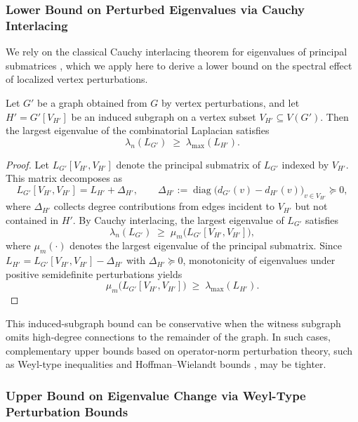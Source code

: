 \documentclass[
  11pt,
  letterpaper]{siamart251216}
\begin{document}
\subsubsection{Lower Bound on Perturbed Eigenvalues via Cauchy
Interlacing}\label{lower-bound-on-perturbed-eigenvalues-via-cauchy-interlacing}

We rely on the classical Cauchy interlacing theorem for eigenvalues of
principal submatrices \citep{Haemers1995, Chung1997Spectral}, which we
apply here to derive a lower bound on the spectral effect of localized
vertex perturbations.

\begin{theorem}\label{thm:induced-lower-bound}
Let $G'$ be a graph obtained from $G$ by vertex perturbations, and let $H' = G'[V_{H'}]$ be an induced subgraph on a vertex subset $V_{H'} \subseteq V(G')$.
Then the largest eigenvalue of the combinatorial Laplacian satisfies
$$
\lambda_n(L_{G'}) \;\ge\; \lambda_{\max}(L_{H'}).
$$
\end{theorem}

\begin{proof}
Let $L_{G'}[V_{H'},V_{H'}]$ denote the principal submatrix of $L_{G'}$ indexed by $V_{H'}$.
This matrix decomposes as
$$
L_{G'}[V_{H'},V_{H'}] = L_{H'} + \Delta_{H'},
\qquad
\Delta_{H'} := \operatorname{diag}\bigl(d_{G'}(v)-d_{H'}(v)\bigr)_{v\in V_{H'}} \succeq 0,
$$
where $\Delta_{H'}$ collects degree contributions from edges incident to $V_{H'}$ but not contained in $H'$.
By Cauchy interlacing, the largest eigenvalue of $L_{G'}$ satisfies
$$
\lambda_n(L_{G'}) \;\ge\; \mu_m\!\bigl(L_{G'}[V_{H'},V_{H'}]\bigr),
$$
where $\mu_m(\cdot)$ denotes the largest eigenvalue of the principal submatrix.
Since $L_{H'} = L_{G'}[V_{H'},V_{H'}] - \Delta_{H'}$ with $\Delta_{H'} \succeq 0$, monotonicity of eigenvalues under positive semidefinite perturbations yields
$$
\mu_m\!\bigl(L_{G'}[V_{H'},V_{H'}]\bigr) \;\ge\; \lambda_{\max}(L_{H'}).
$$
\end{proof}

This induced-subgraph bound can be conservative when the witness
subgraph omits high-degree connections to the remainder of the graph. In
such cases, complementary upper bounds based on operator-norm
perturbation theory, such as Weyl-type inequalities and
Hoffman--Wielandt bounds
\citep{Weyl1912, StewartSun1990, HoffmanWielandt1953}, may be tighter.

\subsubsection{Upper Bound on Eigenvalue Change via Weyl-Type
Perturbation
Bounds}\label{upper-bound-on-eigenvalue-change-via-weyl-type-perturbation-bounds}
\end{document}
